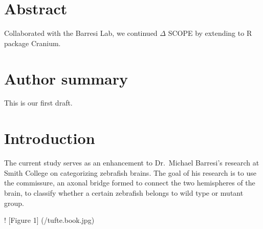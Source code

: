 \documentclass[10pt,letterpaper]{article}
\newcommand{\getIndex}[2]{
  \ForEach{,}{\IfEq{#1}{\thislevelitem}{\number\thislevelcount\ExitForEach}{}}{#2}
}
\newcommand{\getAff}[1]{
  \getIndex{#1}{}
}
\begin{document}
\vspace*{0.2in}

\section*{Abstract}
Collaborated with the Barresi Lab, we continued \(\Delta\) SCOPE by
extending to R package Cranium.

\section*{Author summary}
This is our first draft.

\linenumbers

\section{Introduction}\label{introduction}

The current study serves as an enhancement to Dr.~Michael Barresi's
research at Smith College on categorizing zebrafish brains. The goal of
his research is to use the commissure, an axonal bridge formed to
connect the two hemispheres of the brain, to classify whether a certain
zebrafish belongs to wild type or mutant group.

! {[}Figure 1{]} (/tufte.book.jpg)
\end{document}
